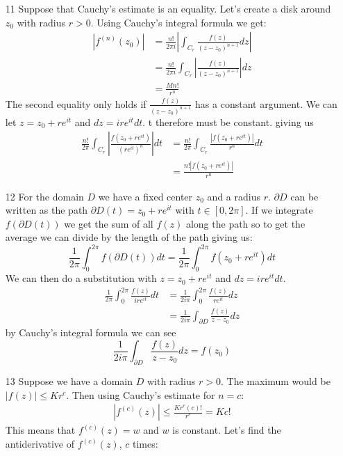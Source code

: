 \documentclass{article}
\begin{document}
  \begin{enumerate}
    \item[11]
      Suppose that Cauchy's estimate is an equality. Let's create a disk around $z_0$ with radius $r>0$.
      Using Cauchy's integral formula we get:
      \begin{align*}
        |f^{(n)}(z_0)|&=\frac{n!}{2\pi i}\left|\int_{C_r}\frac{f(z)}{(z-z_0)^{n+1}}dz\right|\\
        &=\frac{n!}{2\pi i}\int_{C_r}\left|\frac{f(z)}{(z-z_0)^{n+1}}\right|dz\\
        &=\frac{Mn!}{r^{n}}
      \end{align*}
      The second equality only holds if $\frac{f(z)}{(z-z_0)^{n+1}}$ has a constant argument. We can let $z=z_0+re^{it}$ and $dz=ire^{it}dt$. t therefore must be constant. giving us
      \begin{align*}
        \frac{n!}{2\pi}\int_{C_r}\left|\frac{f(z_0+re^{it})}{(re^{it})^{n}}\right|dt
        &=\frac{n!}{2\pi}\int_{C_r}\frac{|f(z_0+re^{it})|}{r^{n}}dt\\
        &=\frac{n!|f(z_0+re^{it})|}{r^n}
      \end{align*}
    \item[12]
      For the domain $D$ we have a fixed center $z_0$ and a radius $r$. $\partial D$ can be written as the path $\partial D(t)=z_0+re^{it}$ with $t\in[0,2\pi]$. If we integrate $f(\partial D(t))$ we get the sum of all $f(z)$ along the path so to get the average we can divide by the length of the path giving us:
      \[
        \frac{1}{2\pi}\int_0^{2\pi}f(\partial D(t))dt=\frac{1}{2\pi}\int_0^{2\pi}f(z_0+re^{it})dt
      \]
      We can then do a substitution with $z=z_0+re^{it}$ and $dz=ire^{it}dt$.
      \begin{align*}
        \frac{1}{2\pi}\int_0^{2\pi}\frac{f(z)}{ire^{it}}dt&=\frac{1}{2i\pi}\int_0^{2\pi}\frac{f(z)}{re^{it}}dz\\
        &=\frac{1}{2i\pi}\int_{\partial D}\frac{f(z)}{z-z_0}dz
      \end{align*}
      by Cauchy's integral formula we can see
      \[\frac{1}{2i\pi}\int_{\partial D}\frac{f(z)}{z-z_0}dz=f(z_0)\]
    \item[13]
      Suppose we have a domain $D$ with radius $r>0$. The maximum would be $|f(z)|\leq Kr^c$. Then using Cauchy's estimate for $n=c$:
      \begin{align*}
        |f^{(c)}(z)|\leq\frac{Kr^c(c)!}{r^c}=Kc!
      \end{align*}
      This means that $f^{(c)}(z)=w$ and $w$ is constant. Let's find the antiderivative of $f^{(c)}(z)$, $c$ times:

\end{enumerate}
\end{document}
